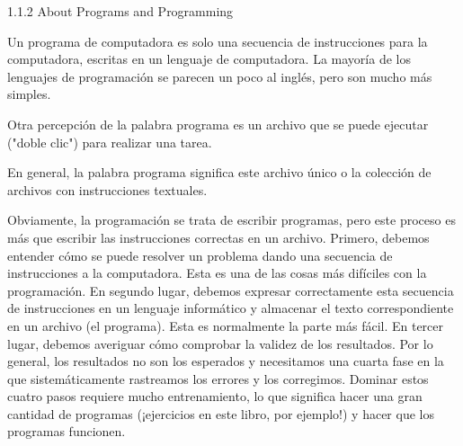 \begin{frame}

1.1.2 About Programs and Programming 

Un programa de computadora es solo una secuencia de instrucciones para la computadora, escritas en un lenguaje de computadora. La mayoría de los lenguajes de programación se parecen un poco al inglés, pero son mucho más simples.

Otra percepción de la palabra programa es un archivo que se puede ejecutar ("doble clic") para realizar una tarea. 

En general, la palabra programa significa este archivo único o la colección de archivos con instrucciones textuales.


Obviamente, la programación se trata de escribir programas, pero este proceso es más que escribir las instrucciones correctas en un archivo. Primero, debemos entender cómo se puede resolver un problema dando una secuencia de instrucciones a la computadora. Esta es una de las cosas más difíciles con la programación. En segundo lugar, debemos expresar correctamente esta secuencia de instrucciones en un lenguaje informático y almacenar el texto correspondiente en un archivo (el programa). Esta es normalmente la parte más fácil. En tercer lugar, debemos averiguar cómo comprobar la validez de los resultados. Por lo general, los resultados no son los esperados y necesitamos una cuarta fase en la que sistemáticamente rastreamos los errores y los corregimos. Dominar estos cuatro pasos requiere mucho entrenamiento, lo que significa hacer una gran cantidad de programas (¡ejercicios en este libro, por ejemplo!) y hacer que los programas funcionen.

\end{frame}

